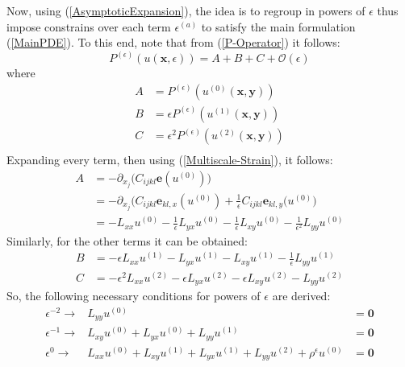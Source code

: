 Now, using (\ref{AsymptoticExpansion}), the idea is to regroup in powers of $\epsilon$ thus impose constrains over each term $\epsilon^{(a)}$ to satisfy the main formulation (\ref{MainPDE}). To this end, note that from (\ref{P-Operator}) it follows:
\begin{equation*}
    P^{(\epsilon)}(u(\mathbf{x},\epsilon)) = A + B + C + \mathcal{O}(\epsilon)
\end{equation*}
where 
\begin{equation*}
    \begin{array}{cc}
        A &= P^{(\epsilon)}(u^{(0)}(\mathbf{x},\mathbf{y})) \\
        B &= \epsilon P^{(\epsilon)}(u^{(1)}(\mathbf{x},\mathbf{y})) \\
        C &= \epsilon^2 P^{(\epsilon)}(u^{(2)}(\mathbf{x},\mathbf{y})) \\
    \end{array}
\end{equation*}
Expanding every term, then using (\ref{Multiscale-Strain}), it follows:
\begin{align*}
    A &= - \partial_{x_j} \big( C_{ijkl}\mathbf{e}(u^{(0)}) \big) \\
    &=- \partial_{x_j} \big( C_{ijkl} \mathbf{e}_{kl,x} (u^{(0)}) + \frac{1}{\epsilon}C_{ijkl}\mathbf{e}_{kl,y}(u^{(0)} \big)\\
    &= - L_{xx}u^{(0)} - \frac{1}{\epsilon} L_{yx}u^{(0)} - \frac{1}{\epsilon} L_{xy}u^{(0)} - \frac{1}{\epsilon^2}L_{yy}u^{(0)}
\end{align*}
Similarly, for the other terms it can be obtained:
\begin{align*}
    B &= -\epsilon L_{xx} u^{(1)} - L_{yx}u^{(1)} - L_{xy} u^{(1)} - \frac{1}{\epsilon} L_{yy}u^{(1)} \\
    C &= -\epsilon^2 L_{xx} u^{(2)} - \epsilon L_{yx}u^{(2)} - \epsilon L_{xy} u^{(2)} - L_{yy}u^{(2)} 
\end{align*}
So, the following necessary conditions for powers of $\epsilon$ are derived:
\begin{equation}
    \label{Epsilon-Separation}
    \begin{array}{ccc}
        \epsilon^{-2} \longrightarrow & L_{yy} u^{(0)} &= \mathbf{0} \\
        \epsilon^{-1} \longrightarrow & L_{xy}u^{(0)} + L_{yx} u^{(0)} + L_{yy} u^{(1)} &= \mathbf{0} \\
        \epsilon^{0} \longrightarrow & L_{xx} u^{(0)} + L_{xy} u^{(1)} + L_{yx} u^{(1)} + L_{yy} u^{(2)} + \rho^{\epsilon} u^{(0)} &= \mathbf{0}
    \end{array}
\end{equation}


